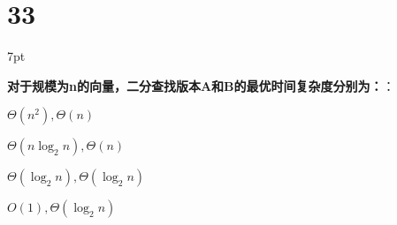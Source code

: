 \documentclass[UTF8]{report}
\theoremstyle{MyLineTheoremStyle} %
\theoremstyle{MyBlockTheoremStyle} %
\theoremstyle{MySubsubsectionStyle} %
\newenvironment{graybox}{%
        \def\FrameCommand{%
        \hspace{1pt}%
        {\color{gray}\small \vrule width 2pt}%
        {\color{graybox_color}\vrule width 4pt}%
        \colorbox{graybox_color}%
        }%
        \MakeFramed{\advance\hsize-\width\FrameRestore}%
        \noindent\hspace{-4.55pt}%
        \begin{adjustwidth}{}{7pt}%
        \vspace{2pt}\vspace{2pt}%
        }
        {%
        \vspace{2pt}\end{adjustwidth}\endMakeFramed%
        }
\begin{document}
\section*{33}

\begin{graybox}
\textbf{对于规模为n的向量，二分查找版本A和B的最优时间复杂度分别为：}：
\begin{circledenum}
    \item $\Theta(n^2), \Theta(n)$
    \item $\Theta(n\log_{2}n), \Theta(n)$
    \item $\Theta(\log_{2}n), \Theta(\log_{2}n)$
    \item $O(1), \Theta(\log_{2}n)$
\end{circledenum}
\end{graybox}
\end{document}
